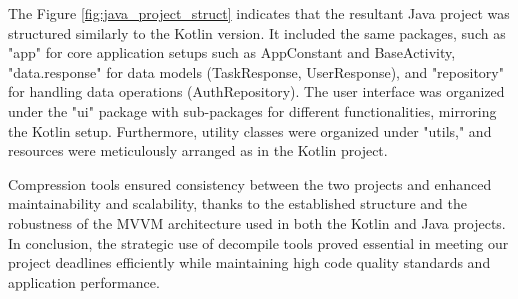 \par
The Figure \ref{fig:java_project_struct} indicates that the resultant Java project was structured similarly to the Kotlin version. It included the same packages, such as "app" for core application setups such as AppConstant and BaseActivity, "data.response" for data models (TaskResponse, UserResponse), and "repository" for handling data operations (AuthRepository). The user interface was organized under the "ui" package with sub-packages for different functionalities, mirroring the Kotlin setup. Furthermore, utility classes were organized under "utils," and resources were meticulously arranged as in the Kotlin project.
\par
Compression tools ensured consistency between the two projects and enhanced maintainability and scalability, thanks to the established structure and the robustness of the MVVM architecture used in both the Kotlin and Java projects. In conclusion, the strategic use of decompile tools proved essential in meeting our project deadlines efficiently while maintaining high code quality standards and application performance.
